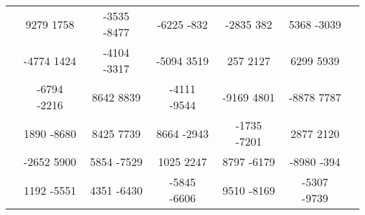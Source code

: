 \begin{landscape}
\begin{table}[]
\begin{tabular}{|c|ccccc|c|}
                & 9279 1758 & -3535 -8477 & -6225 -832 & -2835 382 & 5368 -3039 & 		 \\
                & -4774 1424 & -4104 -3317 & -5094 3519 & 257 2127 & 6299 5939 & 		 \\
                & -6794 -2216 & 8642 8839 & -4111 -9544 & -9169 4801 & -8878 7787 & 		 \\
                & 1890 -8680 & 8425 7739 & 8664 -2943 & -1735 -7201 & 2877 2120 & 		 \\
                & -2652 5900 & 5854 -7529 & 1025 2247 & 8797 -6179 & -8980 -394 & 		 \\
                & 1192 -5551 & 4351 -6430 & -5845 -6606 & 9510 -8169 & -5307 -9739 & 		 \\ \hline
		\end{tabular}
	\end{table}
\end {landscape}
